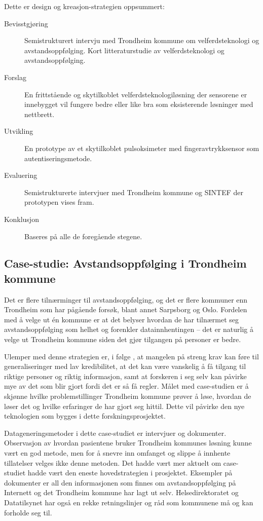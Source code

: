 \begin{minipage}{\linewidth}
Dette er design og kreasjon-strategien oppsummert:\newline

\begin{description}
  \item [Bevisstgjøring] Semistrukturert intervju med Trondheim kommune om velferdsteknologi og avstandsoppfølging. Kort litteraturstudie
  av velferdsteknologi og avstandsoppfølging.
  \item [Forslag] En frittstående og skytilkoblet velferdsteknologiløsning der sensorene er innebygget vil fungere bedre
      eller like bra som eksisterende løsninger med nettbrett.
  \item [Utvikling] En prototype av et skytilkoblet pulsoksimeter med fingeravtrykksensor som autentiseringsmetode.
  \item [Evaluering] Semistrukturerte intervjuer med Trondheim kommune og SINTEF der prototypen vises fram.
  \item [Konklusjon] Baseres på alle de foregående stegene.
\end{description}
\end{minipage}


\subsection{Case-studie: Avstandsoppfølging i Trondheim kommune}
Det er flere tilnærminger til avstandsoppfølging, og det er flere kommuner enn Trondheim som har pågående forsøk, blant annet
Sarpsborg og Oslo. Fordelen med å velge ut én kommune er at det belyser hvordan de har tilnærmet seg avstandsoppfølging
som helhet og forenkler datainnhentingen -- det er naturlig å velge ut Trondheim kommune siden det gjør tilgangen på personer er bedre.

Ulemper med denne strategien er, i følge \citet{oates}, at mangelen på streng krav kan føre til generaliseringer med
lav kredibilitet, at det kan være
vanskelig å få tilgang til riktige personer og riktig informasjon, samt at forskeren i seg selv kan påvirke mye av det som blir gjort fordi det er
så få regler. Målet med case-studien er å skjønne hvilke problemstillinger Trondheim kommune prøver å løse, hvordan de løser det og hvilke
erfaringer de har gjort seg hittil. Dette vil påvirke den nye teknologien som bygges i dette forskningsprosjektet.

Datageneringsmetoder i dette case-studiet er intervjuer og dokumenter. Observasjon av hvordan pasientene bruker Trondheim kommunes løsning
kunne vært en god metode, men for å snevre inn omfanget og slippe å innhente tillatelser velges ikke denne metoden. Det hadde vært mer
aktuelt om case-studiet hadde vært den eneste hovedstrategien i prosjektet. Eksempler på dokumenter er all den informasjonen som finnes om
avstandsoppfølging på Internett og det Trondheim kommune har lagt ut selv. Helsedirektoratet og Datatilsynet
har også en rekke retningslinjer og råd som kommunene må og kan forholde seg til.


